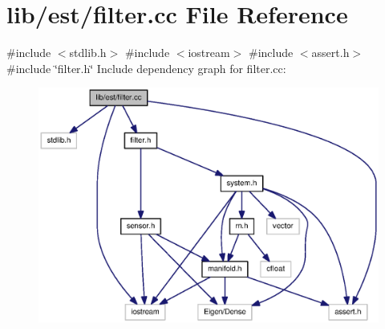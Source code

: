 \section{lib/est/filter.cc \-File \-Reference}
\label{filter_8cc}
{\ttfamily \#include $<$stdlib.\-h$>$}\*
{\ttfamily \#include $<$iostream$>$}\*
{\ttfamily \#include $<$assert.\-h$>$}\*
{\ttfamily \#include \char`\"{}filter.\-h\char`\"{}}\*
\-Include dependency graph for filter.\-cc\-:
\nopagebreak
\begin{figure}[H]
\begin{center}
\leavevmode
\includegraphics[width=350pt]{filter_8cc__incl}
\end{center}
\end{figure}
